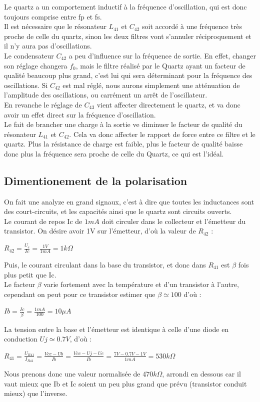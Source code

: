 \documentclass{article}
\begin{document}
Le quartz a un comportement inductif à la fréquence d'oscillation, qui est donc toujours comprise entre fp et fs.\\

Il est nécessaire que le résonateur $L_{41}$ et $C_{42}$ soit accordé à une fréquence très proche de celle du quartz, sinon les deux filtres vont s'annuler réciproquement et il n'y aura pas d'oscillations.\\

Le condensateur $C_{42}$ a peu d'influence sur la fréquence de sortie. En effet, changer son réglage changera $f_0$, mais le filtre réalisé par le Quartz ayant un facteur de qualité beaucoup plus grand, c'est lui qui sera déterminant pour la fréquence des oscillations. Si $C_{42}$ est mal réglé, nous aurons simplement une atténuation de l'amplitude des oscillations, ou carrément un arrêt de l'oscillateur.\\
En revanche le réglage de $C_{43}$ vient affecter directement le quartz, et va donc avoir un effet direct sur la fréquence d'oscillation.\\
Le fait de brancher une charge à la sortie ve diminuer le facteur de qualité du résonateur $L_{41}$ et $C_{42}$. Cela va donc affecter le rapport de force entre ce filtre et le quartz. Plus la résistance de charge est faible, plus le facteur de qualité baisse donc plus la fréquence sera proche de celle du Quartz, ce qui est l'idéal.

\subsection{Dimentionement de la polarisation}
On fait une analyze en grand signaux, c'est à dire que toutes les inductances sont des court-circuits, et les capacités ainsi que le quartz sont circuits ouverts.\\
Le courant de repos Ic de $1mA$ doit circuler dans le collecteur et l'émetteur du transistor. On désire avoir 1V sur l'émetteur, d'où la valeur de $R_{42}$ :
\begin{center}
$R_{42} = \frac{U_e}{Ic} = \frac{1V}{1mA} = 1k\Omega$
\end{center}
Puis, le courant circulant dans la base du transistor, et donc dans $R_{41}$ est $\beta$ fois plus petit que Ic.\\
Le facteur $\beta$ varie fortement avec la température et d'un transistor à l'autre, cependant on peut pour ce transistor estimer que $\beta \simeq 100$ d'où :
\begin{center}
$Ib = \frac{Ic}{\beta} = \frac{1mA}{100} = 10\mu A$
\end{center}
La tension entre la base et l'émetteur est identique à celle d'une diode en conduction $Uj \simeq 0.7V$, d'où :
\begin{center}
$R_{41} = \frac{U_{R41}}{I_{R41}} = \frac{Vcc - Ub}{Ib} = \frac{Vcc - Uj - Ue}{Ib} = \frac{7V - 0.7V - 1V}{1mA} = 530k\Omega$
\end{center}
Nous prenons donc une valeur normalisée de $470k\Omega$, arrondi en dessous car il vaut mieux que Ib et Ic soient un peu plus grand que prévu (transistor conduit mieux) que l'inverse.\\
\end{document}
